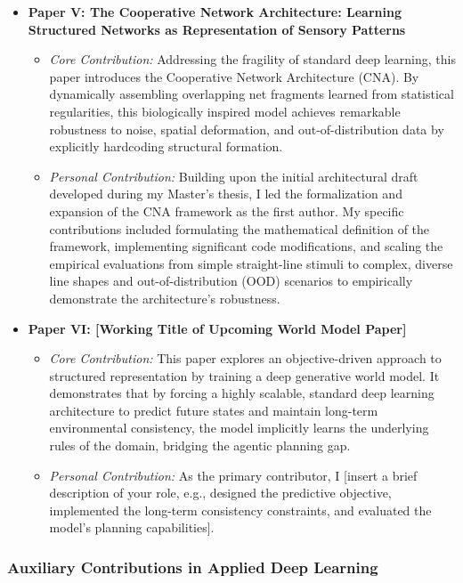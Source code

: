 \begin{itemize}
    \item \textbf{Paper V: The Cooperative Network Architecture: Learning Structured Networks as Representation of Sensory Patterns}
    \begin{itemize}
        \item \textit{Core Contribution:} Addressing the fragility of standard deep learning, this paper introduces the Cooperative Network Architecture (CNA). By dynamically assembling overlapping net fragments learned from statistical regularities, this biologically inspired model achieves remarkable robustness to noise, spatial deformation, and out-of-distribution data by explicitly hardcoding structural formation.
        \item \textit{Personal Contribution:} Building upon the initial architectural draft developed during my Master's thesis, I led the formalization and expansion of the CNA framework as the first author. My specific contributions included formulating the mathematical definition of the framework, implementing significant code modifications, and scaling the empirical evaluations from simple straight-line stimuli to complex, diverse line shapes and out-of-distribution (OOD) scenarios to empirically demonstrate the architecture's robustness.
    \end{itemize}

    \item \textbf{Paper VI: [Working Title of Upcoming World Model Paper]}
    \begin{itemize}
        \item \textit{Core Contribution:} This paper explores an objective-driven approach to structured representation by training a deep generative world model. It demonstrates that by forcing a highly scalable, standard deep learning architecture to predict future states and maintain long-term environmental consistency, the model implicitly learns the underlying rules of the domain, bridging the agentic planning gap.
        \item \textit{Personal Contribution:} As the primary contributor, I [insert a brief description of your role, e.g., designed the predictive objective, implemented the long-term consistency constraints, and evaluated the model's planning capabilities].
    \end{itemize}
\end{itemize}

\subsubsection{Auxiliary Contributions in Applied Deep Learning}

